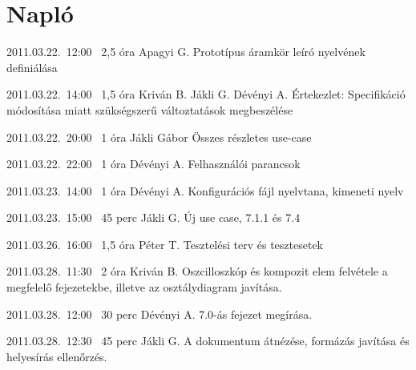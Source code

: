 %
\section{Napló}

\begin{naplo}

\bejegyzes
{2011.03.22.~12:00~} %
{2,5 óra} %
{Apagyi G.} %
{Prototípus áramkör leíró nyelvének definiálása} %

\bejegyzes
{2011.03.22.~14:00~}
{1,5 óra}
{Kriván B.\newline
Jákli G.\newline
Dévényi A.}
{Értekezlet: Specifikáció módosítása miatt szükségszerű változtatások megbeszélése}

\bejegyzes
{2011.03.22.~20:00~}
{1 óra}
{Jákli Gábor}
{Összes részletes use-case}

\bejegyzes
{2011.03.22.~22:00~}
{1 óra}
{Dévényi A.}
{Felhasználói parancsok}

\bejegyzes
{2011.03.23.~14:00~}
{1 óra}
{Dévényi A.}
{Konfigurációs fájl nyelvtana, kimeneti nyelv}

\bejegyzes
{2011.03.23.~15:00~}
{45 perc}
{Jákli G.}
{Új use case, 7.1.1 és 7.4}

\bejegyzes
{2011.03.26.~16:00~}
{1,5 óra}
{Péter T.}
{Tesztelési terv és tesztesetek}

\bejegyzes
{2011.03.28.~11:30~}
{2 óra}
{Kriván B.}
{Oszcilloszkóp és kompozit elem felvétele a megfelelő fejezetekbe, illetve az osztálydiagram javítása.}

\bejegyzes
{2011.03.28.~12:00~}
{30 perc}
{Dévényi A.}
{7.0-ás fejezet megírása.}

\bejegyzes
{2011.03.28.~12:30~}
{45 perc}
{Jákli G.}
{A dokumentum átnézése, formázás javítása és helyesírás ellenőrzés.}

\end{naplo}

